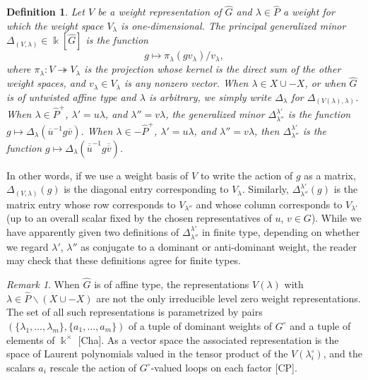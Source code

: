 \documentclass[12pt]{amsart}
\newcommand{\sayHW}[1]{\say[HW]{\color{violet}{\bf HW:}\;#1}}
\newcommand{\kk}{\Bbbk}%
\newcommand\onto{\twoheadrightarrow}
\newcommand{\ol}[1]{\overline{#1}}
\newcommand{\dol}[1]{\overline{\overline{#1}}}
\newtheorem{definition}[theorem]{Definition}
\theoremstyle{remark}
\newtheorem{remark}[theorem]{Remark}
\numberwithin{equation}{section}
\begin{document}
\begin{definition}\label{def:minors}
Let $V$ be a weight representation of $\widehat{G}$ and $\lambda \in \widehat{P}$ a weight for which the weight space $V_\lambda$ is one-dimensional. The principal generalized minor $\Delta_{(V,\lambda)} \in \kk[\widehat{G}]$ is the function 
\[
g \mapsto \pi_\lambda(gv_\lambda)/v_\lambda,
\]
where $\pi_\lambda:V \onto V_\lambda$ is the projection whose kernel is the direct sum of the other weight spaces, and $v_\lambda \in V_\lambda$ is any nonzero vector. When $\lambda \in X \cup -X$, or when $\widehat{G}$ is of untwisted affine type and $\lambda$ is arbitrary, we simply write $\Delta_\lambda$ for $\Delta_{(V(\lambda),\lambda)}$. When $\lambda \in \widehat{P}^+$, $\lambda' = u\lambda$, and $\lambda'' = v\lambda$, the generalized minor $\Delta^{\lambda'}_{\lambda''}$ is the function $g \mapsto \Delta_\lambda(\ol{u}^{-1}g\ol{v})$. When $\lambda \in -\widehat{P}^+$, $\lambda' = u\lambda$, and $\lambda'' = v\lambda$, then $\Delta^{\lambda'}_{\lambda''}$ is the function $g \mapsto \Delta_\lambda(\dol{u}^{-1}g\dol{v})$.
\end{definition}

In other words, if we use a weight basis of $V$ to write the action of $g$ as a matrix, $\Delta_{(V,\lambda)}(g)$ is the diagonal entry corresponding to $V_\lambda$. Similarly, $\Delta^{\lambda'}_{\lambda''}(g)$ is the matrix entry whose row corresponds to $V_{\lambda''}$ and whose column corresponds to $V_{\lambda'}$ (up to an overall scalar fixed by the chosen representatives of $u$, $v \in G$). While we have apparently given two definitions of $\Delta^{\lambda'}_{\lambda''}$ in finite type, depending on whether we regard $\lambda'$, $\lambda''$ as conjugate to a dominant or anti-dominant weight, the reader may check that these definitions agree for finite types. \sayHW{This could be made into a lemma}

\begin{remark}
When $\widehat{G}$ is of affine type, the representations $V(\lambda)$ with $\lambda \in \widehat{P}\smallsetminus(X \cup - X)$ are not the only irreducible level zero weight representations. The set of all such representations is parametrized by pairs $(\{\lambda_1,\dotsc,\lambda_m\},\{a_1,\dotsc,a_m\})$ of a tuple of dominant weights of $G^\circ$ and a tuple of elements of $\kk^\times$ [Cha]. As a vector space the associated representation is the space of Laurent polynomials valued in the tensor product of the $V(\lambda_i^\circ)$, and the scalars $a_i$ rescale the action of $G^\circ$-valued loops on each factor [CP].
\end{remark}
\end{document}
